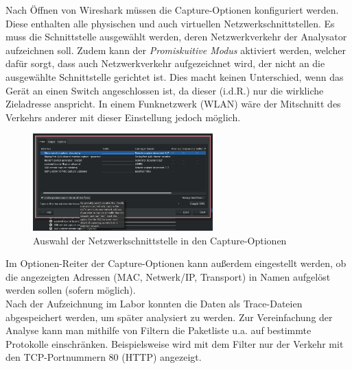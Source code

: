 Nach Öffnen von Wireshark müssen die Capture-Optionen konfiguriert werden. Diese enthalten alle physischen und auch virtuellen Netzwerkschnittstellen. Es muss die Schnittstelle ausgewählt werden, deren Netzwerkverkehr der Analysator aufzeichnen soll. Zudem kann der \emph{Promiskuitive Modus} aktiviert werden, welcher dafür sorgt, dass auch Netzwerkverkehr aufgezeichnet wird, der nicht an die ausgewählte Schnittstelle gerichtet ist. Dies macht keinen Unterschied, wenn das Gerät an einen Switch angeschlossen ist, da dieser (i.d.R.) nur die wirkliche Zieladresse anspricht. In einem Funknetzwerk (WLAN) wäre der Mitschnitt des Verkehrs anderer mit dieser Einstellung jedoch möglich.\\

\begin{figure}[H]
  \begin{center}
      \includegraphics[width=0.618\textwidth]{graphics/capture_options.png}
      \caption{Auswahl der Netzwerkschnittstelle in den Capture-Optionen}
  \end{center}
\end{figure}

Im Optionen-Reiter der Capture-Optionen kann außerdem eingestellt werden, ob die angezeigten Adressen (MAC, Netwerk/IP, Transport) in Namen aufgelöst werden sollen (sofern möglich).\\

Nach der Aufzeichnung im Labor konnten die Daten als Trace-Dateien abgespeichert werden, um später analysiert zu werden. Zur Vereinfachung der Analyse kann man mithilfe von Filtern die Paketliste u.a. auf bestimmte Protokolle einschränken.
Beispielsweise wird mit dem Filter  nur der Verkehr mit den TCP-Portnummern 80 (HTTP) angezeigt.
